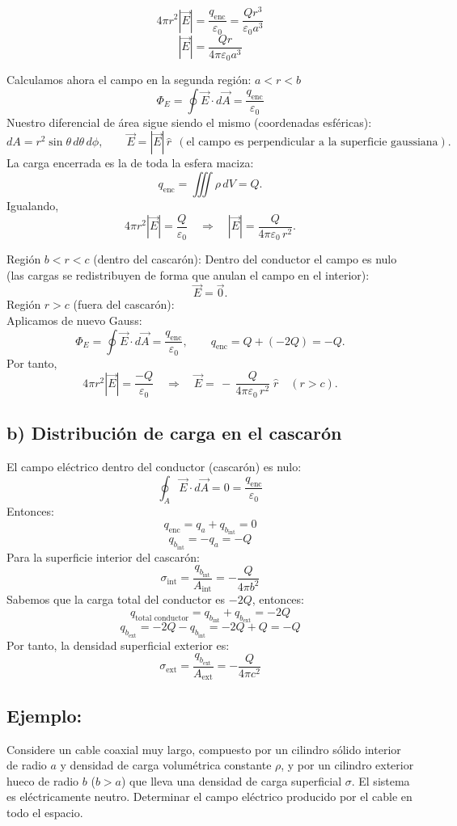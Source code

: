 \documentclass[a4paper,12pt]{article}
\begin{document}
\[
4\pi r^2 |\vec E| = \frac{q_{\text{enc}}}{\varepsilon_0} = \frac{Q r^3}{\varepsilon_0 a^3}
\]
\[
|\vec E| = \frac{Q r}{4\pi \varepsilon_0 a^3}
\]

\newpage
\noindent
Calculamos ahora el campo en la segunda región: \( a < r < b \)
\[
\Phi_E=\oint \vec E\cdot d\vec A=\frac{q_{\text{enc}}}{\varepsilon_0}
\]
Nuestro diferencial de área sigue siendo el mismo (coordenadas esféricas):
\[
dA=r^{2}\sin\theta\,d\theta\,d\phi,
\qquad
\vec E=|\vec E|\,\hat r
\ \ (\text{el campo es perpendicular a la superficie gaussiana}).
\]
La carga encerrada es la de toda la esfera maciza:
\[
q_{\text{enc}}=\iiint \rho\,dV=Q.
\]
Igualando,
\[
4\pi r^{2}|\vec E|=\frac{Q}{\varepsilon_0}
\quad\Longrightarrow\quad
|\vec E|=\frac{Q}{4\pi\varepsilon_0\,r^{2}}.
\]

\medskip
\noindent
Región \(b<r<c\) (dentro del cascarón):
Dentro del conductor el campo es nulo (las cargas se redistribuyen de forma que
anulan el campo en el interior):
\[
\vec E=\vec 0.
\]
\noindent
Región \(r>c\) (fuera del cascarón):\\
Aplicamos de nuevo Gauss:
\[
\Phi_E=\oint \vec E\cdot d\vec A=\frac{q_{\text{enc}}}{\varepsilon_0},
\qquad
q_{\text{enc}}=Q+(-2Q)=-Q.
\]
Por tanto,
\[
4\pi r^{2}|\vec E|=\frac{-Q}{\varepsilon_0}
\quad\Longrightarrow\quad
\vec E=\,-\,\frac{Q}{4\pi\varepsilon_0\,r^{2}}\;\hat r
\quad (r>c).
\]
\subsection*{b) Distribución de carga en el cascarón}
\noindent
El campo eléctrico dentro del conductor (cascarón) es nulo:
\[
\oint_{A}\vec E\cdot d\vec A = 0 = \frac{q_{\text{enc}}}{\varepsilon_0}
\]
Entonces:
\[
q_{\text{enc}} = q_a + q_{b_{\text{int}}} = 0
\]
\[
q_{b_{\text{int}}} = -q_a = -Q
\]
Para la superficie interior del cascarón:
\[
\sigma_{\text{int}} = \frac{q_{b_{\text{int}}}}{A_{\text{int}}} = -\frac{Q}{4\pi b^{2}}
\]
Sabemos que la carga total del conductor es \(-2Q\), entonces:
\[
q_{\text{total conductor}} = q_{b_{\text{int}}} + q_{b_{\text{ext}}} = -2Q
\]
\[
q_{b_{\text{ext}}} = -2Q - q_{b_{\text{int}}} = -2Q + Q = -Q
\]
Por tanto, la densidad superficial exterior es:
\[
\sigma_{\text{ext}} = \frac{q_{b_{\text{ext}}}}{A_{\text{ext}}} = -\frac{Q}{4\pi c^{2}}
\]


\subsection*{Ejemplo:}
\noindent
Considere un cable coaxial muy largo, compuesto por un cilindro sólido interior de radio \(a\) y densidad de carga volumétrica constante \(\rho\), y por un cilindro exterior hueco de radio \(b\) (\(b > a\)) que lleva una densidad de carga superficial \(\sigma\). El sistema es eléctricamente neutro. Determinar el campo eléctrico producido por el cable en todo el espacio.
\end{document}
